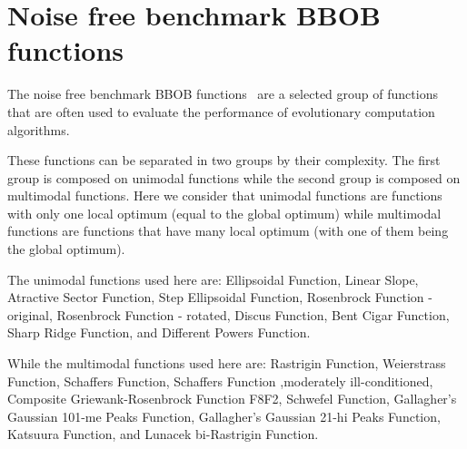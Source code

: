 \section{Noise free benchmark BBOB functions}

The noise free benchmark BBOB functions~\cite{hansen2010real} are a selected group of functions that are often used to evaluate the performance of evolutionary computation algorithms.


These functions can be separated in two groups by their complexity. The first group is composed on unimodal functions while the second group is composed on multimodal functions. Here we consider that unimodal functions are functions with only one local optimum (equal to the global optimum) while multimodal functions are functions that have many local optimum (with one of them being the global optimum). 

The unimodal functions used here are: Ellipsoidal Function, Linear Slope, Atractive Sector Function,  Step Ellipsoidal Function, Rosenbrock Function - original, Rosenbrock Function - rotated, Discus Function, Bent Cigar Function, Sharp Ridge Function, and Different Powers Function.

While the multimodal functions used here are: Rastrigin Function, Weierstrass Function, Schaffers Function, Schaffers Function ,moderately ill-conditioned, Composite Griewank-Rosenbrock Function F8F2, Schwefel Function, Gallagher's Gaussian 101-me Peaks Function, Gallagher's Gaussian 21-hi Peaks Function, Katsuura Function, and Lunacek bi-Rastrigin Function.